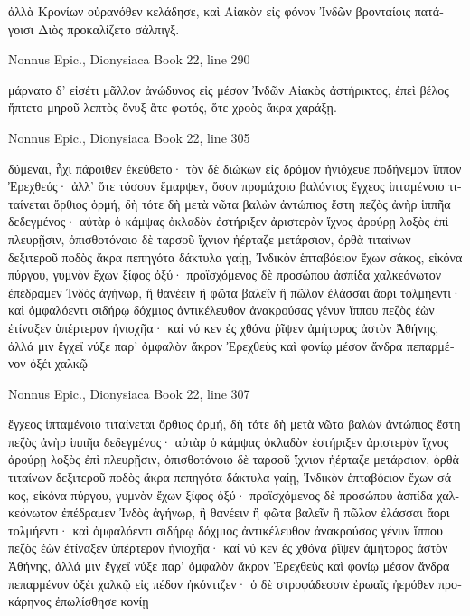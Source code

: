 \documentclass[12pt,letterpaper,twoside,final]{memoir}
\begin{document}
\begin{greek}
                                        ἀλλὰ Κρονίων 
οὐρανόθεν κελάδησε, καὶ Αἰακὸν εἰς φόνον Ἰνδῶν   
βρονταίοις πατάγοισι Διὸς προκαλίζετο σάλπιγξ. 



Nonnus Epic., Dionysiaca 
Book 22, line 290

μάρνατο δ' εἰσέτι μᾶλλον ἀνώδυνος εἰς μέσον Ἰνδῶν 
Αἰακὸς ἀστήρικτος, ἐπεὶ βέλος ἥπτετο μηροῦ 
λεπτὸς ὄνυξ ἅτε φωτός, ὅτε χροὸς ἄκρα χαράξῃ. 



Nonnus Epic., Dionysiaca 
Book 22, line 305

δύμεναι, ἧχι πάροιθεν ἐκεύθετο· τὸν δὲ διώκων 
εἰς δρόμον ἡνιόχευε ποδήνεμον ἵππον Ἐρεχθεύς· 
ἀλλ' ὅτε τόσσον ἔμαρψεν, ὅσον προμάχοιο βαλόντος 
ἔγχεος ἱπταμένοιο τιταίνεται ὄρθιος ὁρμή, 
δὴ τότε δὴ μετὰ νῶτα βαλὼν ἀντώπιος ἔστη 
πεζὸς ἀνὴρ ἱππῆα δεδεγμένος· αὐτὰρ ὁ κάμψας 
ὀκλαδὸν ἐστήριξεν ἀριστερὸν ἴχνος ἀρούρῃ 
λοξὸς ἐπὶ πλευρῇσιν, ὀπισθοτόνοιο δὲ ταρσοῦ 
ἴχνιον ἠέρταζε μετάρσιον, ὀρθὰ τιταίνων 
δεξιτεροῦ ποδὸς ἄκρα πεπηγότα δάκτυλα γαίῃ, 
Ἰνδικὸν ἑπταβόειον ἔχων σάκος, εἰκόνα πύργου, 
γυμνὸν ἔχων ξίφος ὀξύ· προϊσχόμενος δὲ προσώπου   
ἀσπίδα χαλκεόνωτον ἐπέδραμεν Ἰνδὸς ἀγήνωρ, 
ἢ θανέειν ἢ φῶτα βαλεῖν ἢ πῶλον ἐλάσσαι 
ἄορι τολμήεντι· καὶ ὀμφαλόεντι σιδήρῳ 
δόχμιος ἀντικέλευθον ἀνακρούσας γένυν ἵππου 
πεζὸς ἐὼν ἐτίναξεν ὑπέρτερον ἡνιοχῆα· 
καί νύ κεν ἐς χθόνα ῥῖψεν ἀμήτορος ἀστὸν Ἀθήνης, 
ἀλλά μιν ἔγχεϊ νύξε παρ' ὀμφαλὸν ἄκρον Ἐρεχθεὺς 
καὶ φονίῳ μέσον ἄνδρα πεπαρμένον ὀξέι χαλκῷ 




Nonnus Epic., Dionysiaca 
Book 22, line 307

ἔγχεος ἱπταμένοιο τιταίνεται ὄρθιος ὁρμή, 
δὴ τότε δὴ μετὰ νῶτα βαλὼν ἀντώπιος ἔστη 
πεζὸς ἀνὴρ ἱππῆα δεδεγμένος· αὐτὰρ ὁ κάμψας 
ὀκλαδὸν ἐστήριξεν ἀριστερὸν ἴχνος ἀρούρῃ 
λοξὸς ἐπὶ πλευρῇσιν, ὀπισθοτόνοιο δὲ ταρσοῦ 
ἴχνιον ἠέρταζε μετάρσιον, ὀρθὰ τιταίνων 
δεξιτεροῦ ποδὸς ἄκρα πεπηγότα δάκτυλα γαίῃ, 
Ἰνδικὸν ἑπταβόειον ἔχων σάκος, εἰκόνα πύργου, 
γυμνὸν ἔχων ξίφος ὀξύ· προϊσχόμενος δὲ προσώπου   
ἀσπίδα χαλκεόνωτον ἐπέδραμεν Ἰνδὸς ἀγήνωρ, 
ἢ θανέειν ἢ φῶτα βαλεῖν ἢ πῶλον ἐλάσσαι 
ἄορι τολμήεντι· καὶ ὀμφαλόεντι σιδήρῳ 
δόχμιος ἀντικέλευθον ἀνακρούσας γένυν ἵππου 
πεζὸς ἐὼν ἐτίναξεν ὑπέρτερον ἡνιοχῆα· 
καί νύ κεν ἐς χθόνα ῥῖψεν ἀμήτορος ἀστὸν Ἀθήνης, 
ἀλλά μιν ἔγχεϊ νύξε παρ' ὀμφαλὸν ἄκρον Ἐρεχθεὺς 
καὶ φονίῳ μέσον ἄνδρα πεπαρμένον ὀξέι χαλκῷ 
εἰς πέδον ἠκόντιζεν· ὁ δὲ στροφάδεσσιν ἐρωαῖς 
ἠερόθεν προκάρηνος ἐπωλίσθησε κονίῃ 





\end{greek}
\end{document}
